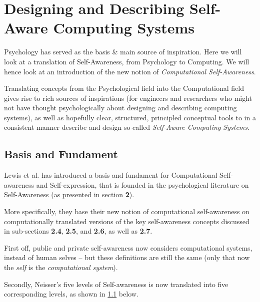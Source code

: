 


\section{Designing and Describing Self-Aware Computing Systems}

Psychology has served as the basis \& main source of inspiration. Here we will look at a translation of Self-Awareness, from Psychology to Computing. We will hence look at an introduction of the new notion of \textit{Computational Self-Awareness}.

Translating concepts from the Psychological field into the Computational field gives rise to rich sources of inspirations (for engineers and researchers who might not have thought psychologically about designing and describing computing systems), as well as hopefully clear, structured, principled conceptual tools to in a consistent manner describe and design so-called \textit{Self-Aware Computing Systems}.

	\subsection{Basis and Fundament}

	Lewis et al. \cite{sacs16_ch2} has introduced a basis and fundament for Computational Self-awareness and Self-expression, that is founded in the psychological literature on Self-Awareness (as presented in section \textbf{2}).

	More specifically, they base their new notion of computational self-awareness on computationally translated versions of the key self-awareness concepts discussed in sub-sections \textbf{2.4}, \textbf{2.5}, and \textbf{2.6}, as well as \textbf{2.7}.

	First off, public and private self-awareness now considers computational systems, instead of human selves -- but these definitions are still the same (only that now the \textit{self} is the \textit{computational system}).

	Secondly, Neisser's five levels of Self-awareness is now translated into five corresponding levels, as shown in \ref{} below.

